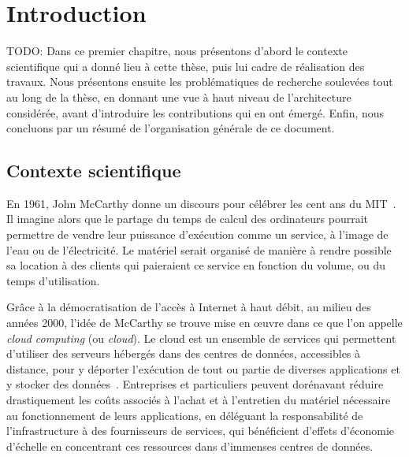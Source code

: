 \chapter{Introduction}
\label{chapter:introduction}

TODO: Dans ce premier chapitre, nous présentons d'abord le contexte scientifique qui a donné lieu à cette thèse, puis lui cadre de réalisation des travaux. Nous présentons ensuite les problématiques de recherche soulevées tout au long de la thèse, en donnant une vue à haut niveau de l'architecture considérée, avant d'introduire les contributions qui en ont émergé. Enfin, nous concluons par un résumé de l'organisation générale de ce document.

\section{Contexte scientifique}

En 1961, John McCarthy donne un discours pour célébrer les cent ans du MIT~\cite{greenberger1962management}. Il imagine alors que le partage du temps de calcul des ordinateurs pourrait permettre de vendre leur puissance d'exécution comme un service, à l'image de l'eau ou de l'électricité. Le matériel serait organisé de manière à rendre possible sa location à des clients qui paieraient ce service en fonction du volume, ou du temps d'utilisation.

Grâce à la démocratisation de l'accès à Internet à haut débit, au milieu des années 2000, l'idée de McCarthy se trouve mise en œuvre dans ce que l'on appelle \textit{cloud computing} (ou \textit{cloud}). Le cloud est un ensemble de services qui permettent d'utiliser des serveurs hébergés dans des centres de données, accessibles à distance, pour y déporter l'exécution de tout ou partie de diverses applications et y stocker des données~\cite{hayesCloudComputing2008}. Entreprises et particuliers peuvent dorénavant réduire drastiquement les coûts associés à l'achat et à l'entretien du matériel nécessaire au fonctionnement de leurs applications, en déléguant la responsabilité de l'infrastructure à des fournisseurs de services, qui bénéficient d'effets d'économie d'échelle en concentrant ces ressources dans d'immenses centres de données.


